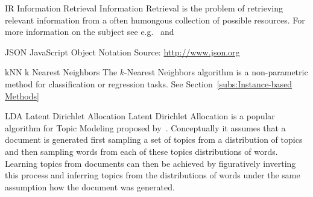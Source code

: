 
  {IR}
  {Information Retrieval}
  {Information Retrieval is the problem of retrieving relevant information from a often humongous collection of possible resources. For more information on the subject see e.g.~\cite{Rijsbergen:1979aa} and~\cite{Manning:2008aa}} %


  {JSON}
  {JavaScript Object Notation}
  { Source: \url{http://www.json.org}} %


  {kNN}
  {k Nearest Neighbors}
  {The $k$-Nearest Neighbors algorithm is a non-parametric method for classification or regression tasks. See Section~\ref{subs:Instance-based Methods}} %




  {LDA}
  {Latent Dirichlet Allocation}
  {Latent Dirichlet Allocation is a popular algorithm for \gls{Topic Modeling} proposed by~\cite{Blei:2003aa}. Conceptually it assumes that a document is generated first sampling a set of topics from a distribution of topics and then sampling words from each of these topics distributions of words. Learning topics from documents can then be achieved by figuratively inverting this process and inferring topics from the distributions of words under the same assumption how the document was generated.}

